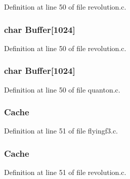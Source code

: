 Definition at line 50 of file revolution.\-c.

\hypertarget{group___open_pilot_core_gaaf1490d688e7cf0c41987d87572ff80a}{
\subsubsection[{Buffer}]{\setlength{\rightskip}{0pt plus 5cm}char Buffer\mbox{[}1024\mbox{]}}}\label{group___open_pilot_core_gaaf1490d688e7cf0c41987d87572ff80a}


Definition at line 50 of file revolution.\-c.

\hypertarget{group___open_pilot_core_gaaf1490d688e7cf0c41987d87572ff80a}{
\subsubsection[{Buffer}]{\setlength{\rightskip}{0pt plus 5cm}char Buffer\mbox{[}1024\mbox{]}}}\label{group___open_pilot_core_gaaf1490d688e7cf0c41987d87572ff80a}


Definition at line 50 of file quanton.\-c.

\hypertarget{group___open_pilot_core_gaef8c3e152589675df7f5b49cc1ba7ffd}{
\subsubsection[{Cache}]{ Cache}}\label{group___open_pilot_core_gaef8c3e152589675df7f5b49cc1ba7ffd}


Definition at line 51 of file flyingf3.\-c.

\hypertarget{group___open_pilot_core_gaef8c3e152589675df7f5b49cc1ba7ffd}{
\subsubsection[{Cache}]{ Cache}}\label{group___open_pilot_core_gaef8c3e152589675df7f5b49cc1ba7ffd}


Definition at line 51 of file revolution.\-c.

